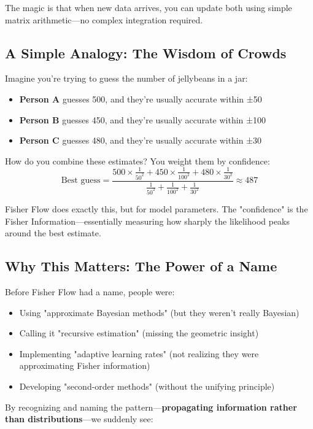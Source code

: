 \documentclass[11pt]{article}
\begin{document}
The magic is that when new data arrives, you can update both using simple matrix arithmetic—no complex integration required.

\subsection{A Simple Analogy: The Wisdom of Crowds}

Imagine you're trying to guess the number of jellybeans in a jar:

\begin{itemize}
\item \textbf{Person A} guesses 500, and they're usually accurate within ±50
\item \textbf{Person B} guesses 450, and they're usually accurate within ±100
\item \textbf{Person C} guesses 480, and they're usually accurate within ±30
\end{itemize}

How do you combine these estimates? You weight them by confidence:
\begin{equation*}
\text{Best guess} = \frac{500 \times \frac{1}{50^2} + 450 \times \frac{1}{100^2} + 480 \times \frac{1}{30^2}}{\frac{1}{50^2} + \frac{1}{100^2} + \frac{1}{30^2}} \approx 487
\end{equation*}

Fisher Flow does exactly this, but for model parameters. The "confidence" is the Fisher Information—essentially measuring how sharply the likelihood peaks around the best estimate.

\subsection{Why This Matters: The Power of a Name}

Before Fisher Flow had a name, people were:
\begin{itemize}
\item Using "approximate Bayesian methods" (but they weren't really Bayesian)
\item Calling it "recursive estimation" (missing the geometric insight)
\item Implementing "adaptive learning rates" (not realizing they were approximating Fisher information)
\item Developing "second-order methods" (without the unifying principle)
\end{itemize}

By recognizing and naming the pattern—\textbf{propagating information rather than distributions}—we suddenly see:
\end{document}
